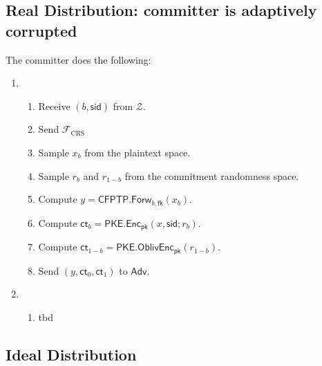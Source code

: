 \documentclass[11pt,letterpaper]{article}
\theoremstyle{plain} %
\theoremstyle{definition} %
\theoremstyle{remark} %
\newcommand{\Input}{x}
\newcommand{\PKE}{\mathsf{PKE}}
\newcommand{\Enc}{\mathsf{Enc}}
\newcommand{\OblivEnc}{\mathsf{OblivEnc}}
\newcommand{\EncKey}{\mathsf{pk}}
\newcommand{\Ct}{\mathsf{ct}}
\newcommand{\Rand}{r}
\newcommand{\CFPTP}{\mathsf{CFPTP}}
\newcommand{\Forw}{\mathsf{Forw}}
\newcommand{\ForwKey}{\mathsf{fk}}
\newcommand{\CFPTPOutput}{y}
\newcommand{\Adversary}{{\mathsf{Adv}}} %
\newcommand{\Environment}{{\mathcal{Z}}} %
\newcommand{\IF}{\mathcal{F}} %
\newcommand{\sid}{\mathsf{sid}}
\newcommand{\IFCrs}{\IF_{\mathrm{CRS}}}
\newcommand{\CommittedBit}{b}
\begin{document}
\subsection{Real Distribution: committer is adaptively corrupted}
\label{sec:real-distribution}

\begin{minipage}{0.9\textwidth}
 The committer does the following:
\begin{enumerate}[nolistsep]
	\item {}

	\begin{enumerate}[nolistsep]
		\item Receive $(\CommittedBit,\sid)$ from $\Environment$.
		\item Send $\IFCrs$
		\item Sample $\Input_{\CommittedBit}$ from the plaintext space.
		\item Sample $\Rand_{\CommittedBit}$ and $\Rand_{1-\CommittedBit}$ from the commitment randomness space.
		\item Compute $\CFPTPOutput = \CFPTP.\Forw_{\CommittedBit, \ForwKey}(\Input_{\CommittedBit})$.
		\item Compute $\Ct_{\CommittedBit} = \PKE.\Enc_\EncKey(\Input, \sid; \Rand_\CommittedBit)$.
		\item Compute $\Ct_{1-\CommittedBit} = \PKE.\OblivEnc_\EncKey(\Rand_{1-\CommittedBit})$.
		\item Send $(\CFPTPOutput, \Ct_0, \Ct_1)$ to $\Adversary$.
	\end{enumerate}

	\item {}

	\begin{enumerate}[nolistsep]
		\item tbd
	\end{enumerate}
\end{enumerate}
\end{minipage}

\subsection{Ideal Distribution}
\label{sec:ideal-distribution}
\end{document}
